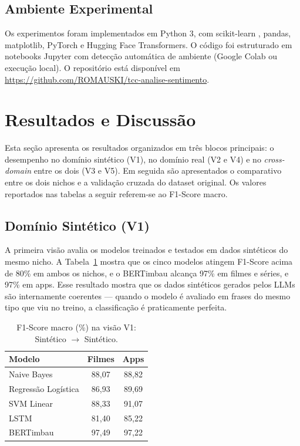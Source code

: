 \documentclass[12pt]{article}
\begin{document}
\subsection{Ambiente Experimental}

Os experimentos foram implementados em Python 3, com scikit-learn \cite{pedregosa2011}, pandas, matplotlib, PyTorch e Hugging Face Transformers. O código foi estruturado em notebooks Jupyter com detecção automática de ambiente (Google Colab ou execução local). O repositório está disponível em \url{https://github.com/ROMAUSKI/tcc-analise-sentimento}.



\section{Resultados e Discussão}
\label{sec:resultados}

Esta seção apresenta os resultados organizados em três blocos principais: o desempenho no domínio sintético (V1), no domínio real (V2 e V4) e no \textit{cross-domain} entre os dois (V3 e V5). Em seguida são apresentados o comparativo entre os dois nichos e a validação cruzada do dataset original. Os valores reportados nas tabelas a seguir referem-se ao F1-Score macro.

\subsection{Domínio Sintético (V1)}

A primeira visão avalia os modelos treinados e testados em dados sintéticos do mesmo nicho. A Tabela~\ref{tab:v1} mostra que os cinco modelos atingem F1-Score acima de 80\% em ambos os nichos, e o BERTimbau alcança 97\% em filmes e séries, e 97\% em apps. Esse resultado mostra que os dados sintéticos gerados pelos LLMs são internamente coerentes — quando o modelo é avaliado em frases do mesmo tipo que viu no treino, a classificação é praticamente perfeita.

\begin{table}[h]
\centering
\caption{F1-Score macro (\%) na visão V1: Sintético $\rightarrow$ Sintético.}
\label{tab:v1}
\begin{tabular}{lcc}
\toprule
\textbf{Modelo} & \textbf{Filmes} & \textbf{Apps} \\
\midrule
Naive Bayes         & 88,07 & 88,82 \\
Regressão Logística & 86,93 & 89,69 \\
SVM Linear          & 88,33 & 91,07 \\
LSTM                & 81,40 & 85,22 \\
BERTimbau           & 97,49 & 97,22 \\
\bottomrule
\end{tabular}
\end{table}
\end{document}
